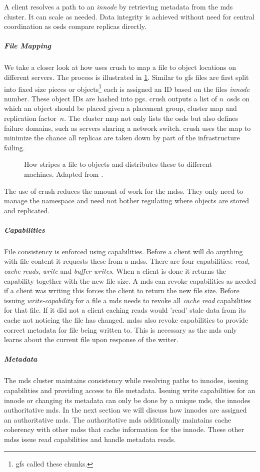 A client resolves a path to an \textit{innode} by retrieving metadata from the \ac{mds} cluster. It can scale as needed. Data integrity is achieved without need for central coordination as \acp{osd} compare replicas directly. 
%
\subparagraph{File Mapping}
We take a closer look at how \ceph{} uses \ac{crush} to map a file to object locations on different servers. The process is illustrated in \cref{fig:ceph_crush}. Similar to \ac{gfs} files are first split into fixed size pieces or objects\footnote{\ac{gfs} called these chunks.} each is assigned an ID based on the files \textit{innode} number. These object IDs are hashed into \acp{pg}. \ac{crush} outputs a list of $n$~\acp{osd} on which an object should be placed given a placement group, cluster map and replication factor~$n$. The cluster map not only lists the \acp{osd} but also defines failure domains, such as servers sharing a network switch. \ac{crush} uses the map to minimize the chance all replicas are taken down by part of the infrastructure failing.

\begin{figure}[htbp]
	\centering
	
	\caption{How \ceph{} stripes a file to objects and distributes these to different machines. Adapted from \cite{ceph}.}
	\label{fig:ceph_crush}
\end{figure}

The use of \ac{crush} reduces the amount of work for the \acp{mds}. They only need to manage the namespace and need not bother regulating where objects are stored and replicated.
%
\subparagraph{Capabilities}
File consistency is enforced using capabilities. Before a client will do anything with file content it requests these from a \acp{mds}. There are four capabilities: \textit{read}, \textit{cache} \textit{reads}, \textit{write} and \textit{buffer writes}. When a client is done it returns the capability together with the new file size. A \ac{mds} can revoke capabilities as needed if a client was writing this forces the client to return the new file size. Before issuing \textit{write-capability} for a file a \ac{mds} needs to revoke all \textit{cache read} capabilities for that file. If it did not a client caching reads would 'read' stale data from its cache not noticing the file has changed. \acp{mds} also revoke capabilities to provide correct metadata for file being written to. This is necessary as the \ac{mds} only learns about the current file upon response of the writer.
%
\subparagraph{Metadata}
The \ac{mds} cluster maintains consistency while resolving paths to innodes, issuing capabilities and providing access to file metadata. Issuing write capabilities for an innode or changing its metadata can only be done  by a unique \ac{mds}, the innodes authoritative \ac{mds}. In the next section we will discuss how innodes are assigned an authoritative \ac{mds}. The authoritative \ac{mds} additionally maintains cache coherency with other \acp{mds} that cache information for the innode. These other \acp{mds} issue read capabilities and handle metadata reads.

